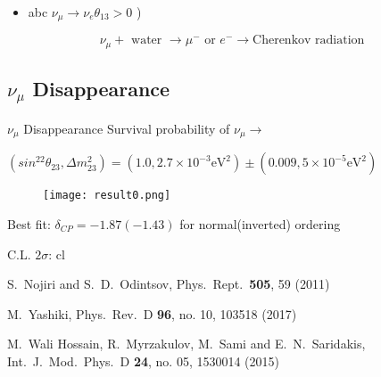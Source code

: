 \documentclass{beamer}
\begin{document}
\begin{itemize}
	\item abc $\nu_\mu \rightarrow \nu_e \theta_{13} > 0$ )
\end{itemize}


\begin{equation*}
	\nu_{\mu} + \, \, \text{water} \, \, \rightarrow \mu^- \, \, \text{or} \, \, e^- \rightarrow \text{Cherenkov radiation}
\end{equation*}

\subsection{$\nu_\mu$ Disappearance}
\begin{frame}{$\nu_\mu$ Disappearance}
	Survival probability of $\nu_\mu \rightarrow$

	$(sin^22\theta_{23} , \Delta m^2_{23}) = (1.0 , 2.7 \times 10^{-3} \text{eV}^2) \pm (0.009, 5 \times 10^{-5} \text{eV}^2)$

	\begin{figure}[h]
		\texttt{[image: result0.png]}
	\end{figure}
\end{frame}

Best fit: $\delta_{CP} = -1.87(-1.43)$ for normal(inverted) ordering

C.L. $2\sigma$: cl

\begin{thebibliography}{9}
	  S.~Nojiri and S.~D.~Odintsov,
	  Phys.\ Rept.\  {\bf 505}, 59 (2011)

	  M.~Yashiki,
	  Phys.\ Rev.\ D {\bf 96}, no. 10, 103518 (2017)

	  M.~Wali Hossain, R.~Myrzakulov, M.~Sami and E.~N.~Saridakis,
	  Int.\ J.\ Mod.\ Phys.\ D {\bf 24}, no. 05, 1530014 (2015)
\end{thebibliography}
\end{document}
